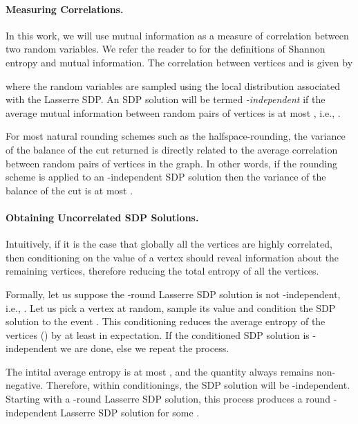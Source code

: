 \documentclass[11pt]{article}
\theoremstyle{definition}
\numberwithin{equation}{section}
\let\origparagraph\paragraph
\renewcommand{\paragraph}[1]{\origparagraph{#1.}}
\let\pref=\prettyref
\begin{document}
\paragraph{Measuring Correlations}

  In this work, we will use mutual
information as a measure of correlation between two random variables.
We refer the reader to \pref{sec:prelim} for the definitions of
Shannon entropy and mutual information.  The correlation between vertices  and  is given by

where the random variables  are sampled using the local distribution
 associated with the Lasserre SDP.
An SDP solution will be termed {\it -independent} if the average
mutual information between random pairs of vertices is at most
, i.e., .

For most natural rounding schemes such as the halfspace-rounding, the variance
of the balance of the cut returned is
directly related to the average correlation between random pairs
of vertices in the graph.  In other words, if the rounding scheme is
applied to an -independent SDP solution then the variance of
the balance of the cut is at most .


\paragraph{Obtaining Uncorrelated SDP Solutions}



Intuitively, if it is the case that globally all the vertices are
highly correlated, then conditioning on the value of a vertex should
reveal information about the remaining vertices, therefore reducing
the total entropy of all the vertices.

Formally, let us suppose the -round Lasserre SDP solution is not
-independent, i.e.,  .
Let us pick a vertex  at random, sample its value  and condition the SDP
solution to the event .  This conditioning reduces the
average entropy of the vertices () by at least
 in expectation.  If the conditioned SDP solution is
-independent we are done, else we repeat the process.

The intital average entropy  is at most , and
the quantity always remains non-negative.  Therefore, within
 conditionings, the SDP solution will be
-independent.  Starting with a -round Lasserre SDP
solution, this process produces a  round -independent Lasserre
SDP solution for some .
\end{document}
